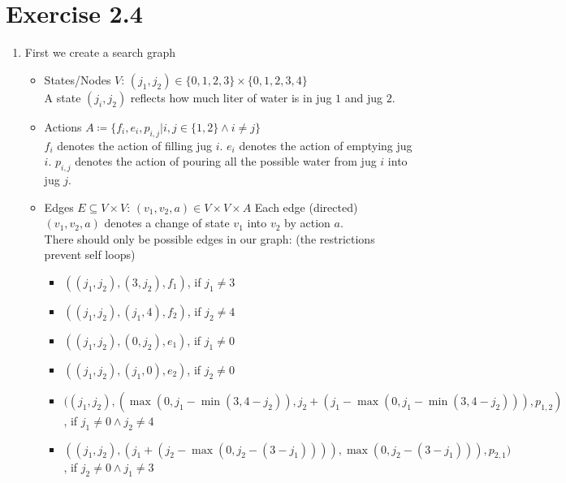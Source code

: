 \documentclass{article}
\begin{document}
\section*{Exercise 2.4}
\begin{enumerate}[label=(\alph*)]
	\item	First we create a search graph
			\begin{itemize}
				\item	States/Nodes $V$: $(j_1,j_2) \in \{0,1,2,3\} \times \{0,1,2,3,4\}$\\
						A state $(j_i, j_2)$ reflects how much liter of water is in jug $1$ and jug $2$.
				\item	Actions $A \coloneqq \{f_i, e_i, p_{i,j} \vert i,j \in \{1,2\} \land i \neq j\}$\\
						$f_i$ denotes the action of filling jug $i$. $e_i$ denotes the action of emptying jug $i$. $p_{i,j}$ denotes the action of pouring all the possible water from jug $i$ into jug $j$.
				\item	Edges $E \subseteq V \times V$: $(v_1, v_2, a) \in V \times V \times A$
						Each edge (directed) $(v_1, v_2, a)$ denotes a change of state $v_1$ into $v_2$ by action $a$.\\
						There should only be possible edges in our graph: (the restrictions prevent self loops)
						\begin{itemize}
							\item	$((j_1, j_2), (3, j_2), f_1)$, if $j_1 \neq 3$
							\item	$((j_1, j_2), (j_1, 4), f_2)$, if $j_2 \neq 4$
							\item	$((j_1, j_2), (0, j_2), e_1)$, if $j_1 \neq 0$
							\item	$((j_1, j_2), (j_1, 0), e_2)$, if $j_2 \neq 0$
							\item	$((j_1, j_2), (\max(0, j_1 - \min(3, 4-j_2)), j_2 + (j_1 - \max(0, j_1 - \min(3, 4-j_2))), p_{1,2})$, if $j_1 \neq 0 \land j_2 \neq 4$
							\item	$((j_1, j_2), (j_1 + (j_2 - \max(0, j_2 - (3 - j_1)))), \max(0, j_2 - (3 - j_1))), p_{2,1})$, if $j_2 \neq 0 \land j_1 \neq 3$
						\end{itemize}
			\end{itemize}


\end{enumerate}
\end{document}
